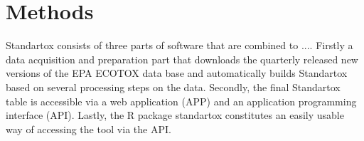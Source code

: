 \section*{Methods}

Standartox consists of three parts of software that are combined to .... Firstly a data acquisition and preparation part that downloads the quarterly released new versions of the EPA ECOTOX data base and automatically builds Standartox based on several processing steps on the data. Secondly, the final Standartox table is accessible via a web application (APP) and an application programming interface (API). Lastly, the R \citep{rcoreteam_language_2017} package standartox constitutes an easily usable way of accessing the tool via the API.

